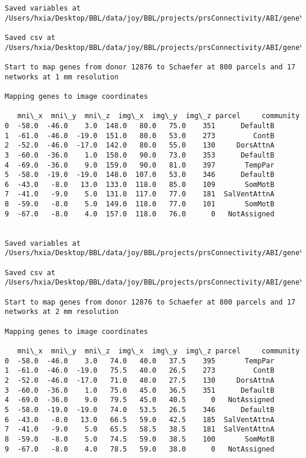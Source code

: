 \documentclass[11pt]{article}
\begin{document}
\begin{Verbatim}[commandchars=\\\{\}]
Saved variables at /Users/hxia/Desktop/BBL/data/joy/BBL/projects/prsConnectivity/ABI/gene\_mapping/12876donor\_800Parcels\_7Network\_2mm.pkl

Saved csv at /Users/hxia/Desktop/BBL/data/joy/BBL/projects/prsConnectivity/ABI/gene\_mapping/12876donor\_800Parcels\_7Network\_2mm.csv

Start to map genes from donor 12876 to Schaefer at 800 parcels and 17 networks at 1 mm resolution

Mapping genes to image coordinates

   mni\_x  mni\_y  mni\_z  img\_x  img\_y  img\_z parcel     community
0  -58.0  -46.0    3.0  148.0   80.0   75.0    351      DefaultB
1  -61.0  -46.0  -19.0  151.0   80.0   53.0    273         ContB
2  -52.0  -46.0  -17.0  142.0   80.0   55.0    130     DorsAttnA
3  -60.0  -36.0    1.0  150.0   90.0   73.0    353      DefaultB
4  -69.0  -36.0    9.0  159.0   90.0   81.0    397       TempPar
5  -58.0  -19.0  -19.0  148.0  107.0   53.0    346      DefaultB
6  -43.0   -8.0   13.0  133.0  118.0   85.0    109       SomMotB
7  -41.0   -9.0    5.0  131.0  117.0   77.0    181  SalVentAttnA
8  -59.0   -8.0    5.0  149.0  118.0   77.0    101       SomMotB
9  -67.0   -8.0    4.0  157.0  118.0   76.0      0   NotAssigned


Saved variables at /Users/hxia/Desktop/BBL/data/joy/BBL/projects/prsConnectivity/ABI/gene\_mapping/12876donor\_800Parcels\_17Network\_1mm.pkl

Saved csv at /Users/hxia/Desktop/BBL/data/joy/BBL/projects/prsConnectivity/ABI/gene\_mapping/12876donor\_800Parcels\_17Network\_1mm.csv

Start to map genes from donor 12876 to Schaefer at 800 parcels and 17 networks at 2 mm resolution

Mapping genes to image coordinates

   mni\_x  mni\_y  mni\_z  img\_x  img\_y  img\_z parcel     community
0  -58.0  -46.0    3.0   74.0   40.0   37.5    395       TempPar
1  -61.0  -46.0  -19.0   75.5   40.0   26.5    273         ContB
2  -52.0  -46.0  -17.0   71.0   40.0   27.5    130     DorsAttnA
3  -60.0  -36.0    1.0   75.0   45.0   36.5    351      DefaultB
4  -69.0  -36.0    9.0   79.5   45.0   40.5      0   NotAssigned
5  -58.0  -19.0  -19.0   74.0   53.5   26.5    346      DefaultB
6  -43.0   -8.0   13.0   66.5   59.0   42.5    185  SalVentAttnA
7  -41.0   -9.0    5.0   65.5   58.5   38.5    181  SalVentAttnA
8  -59.0   -8.0    5.0   74.5   59.0   38.5    100       SomMotB
9  -67.0   -8.0    4.0   78.5   59.0   38.0      0   NotAssigned



\end{Verbatim}
\end{document}
